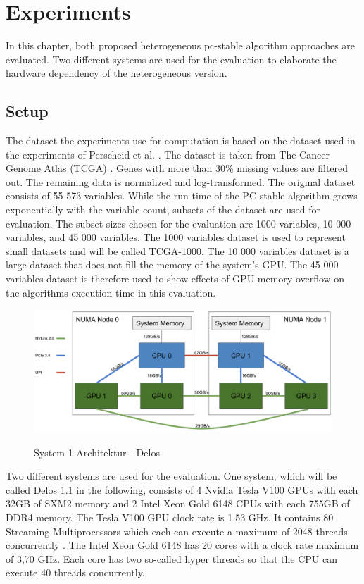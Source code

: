 \chapter{Experiments}
In this chapter, both proposed heterogeneous pc-stable algorithm approaches are evaluated. Two different systems are used for the evaluation to elaborate the hardware dependency of the heterogeneous version.

\section{Setup}
The dataset the experiments use for computation is based on the dataset used in the experiments of Perscheid et al. \cite{perscheidIntegrativeGeneSelection2018}. The dataset is taken from The Cancer Genome Atlas (TCGA) \cite{weinsteinCancerGenomeAtlas2013}. Genes with more than 30\% missing values are filtered out. The remaining data is normalized and log-transformed. The original dataset consists of 55 573 variables. While the run-time of the PC stable algorithm grows exponentially with the variable count, subsets of the dataset are used for evaluation. The subset sizes chosen for the evaluation are 1000 variables, 10 000 variables, and 45 000 variables. The 1000 variables dataset is used to represent small datasets and will be called TCGA-1000. The 10 000 variables dataset is a large dataset that does not fill the memory of the system's GPU. The 45 000 variables dataset is therefore used to show effects of GPU memory overflow on the algorithms execution time in this evaluation.

\begin{figure}[h]
  \caption{System 1 Architektur - Delos}
  \includegraphics[width=\textwidth]{figures/delos_system_arch.png}
  \centering
  \label{fig:delos_arch}
\end{figure}

Two different systems are used for the evaluation. One system, which will be called Delos \ref{fig:delos_arch} in the following, consists of 4 Nvidia Tesla V100 GPUs with each 32GB of SXM2 memory and 2 Intel Xeon Gold 6148 CPUs with each 755GB of DDR4 memory. The Tesla V100 GPU clock rate is 1,53 GHz. It contains 80 Streaming Multiprocessors which each can execute a maximum of 2048 threads concurrently \cite{NVIDIATESLAV1002017}. The Intel Xeon Gold 6148 has 20 cores with a clock rate maximum of 3,70 GHz. Each core has two so-called hyper threads so that the CPU can execute 40 threads concurrently.

